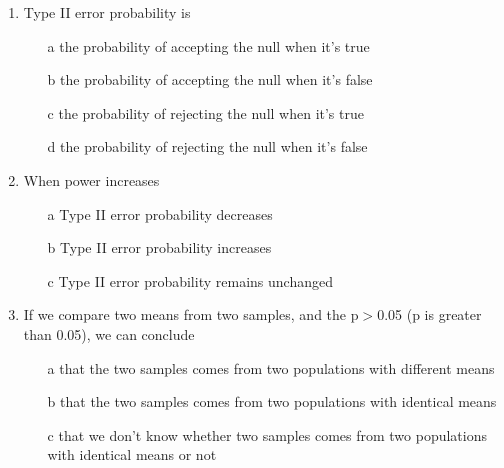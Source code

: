 \documentclass[a4]{article}
\begin{document}
\begin{enumerate}
\item
Type II error probability is

\begin{enumerate}
\item[a]
the probability of accepting the null when it's true
\item[b]
the probability of accepting the null when it's false
\item[c]
the probability of rejecting the null when it's true
\item[d]
the probability of rejecting the null when it's false
\end{enumerate}

\item
When power increases
\begin{enumerate}
\item[a]
Type II error probability decreases
\item[b]
Type II error probability increases
\item[c]
Type II error probability remains unchanged
\end{enumerate}

\item
If we compare two means from two samples, and the p$>$0.05 (p is greater than 0.05), we can conclude 

\begin{enumerate}
\item[a]
that the two samples comes from two populations with different means
\item[b]
 that the two samples comes from two populations with identical means
\item[c]
that we don't know whether two samples comes from two populations with identical means or not
\end{enumerate}

\end{enumerate}
\end{document}
